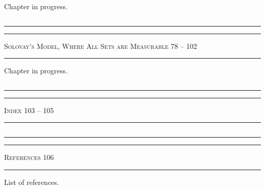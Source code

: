 \noindent Chapter in progress.

${}$\\[-0.1cm] \hrule\hrule
${}$\\[0.2cm]
{\scshape Solovay's Model, Where All Sets are Measurable \hfill 78 -- 102 } \\[-0.3cm]
\hrule
${}$\\[-0.1cm]

\noindent Chapter in progress.

${}$\\[-0.1cm] \hrule\hrule
${}$\\[0.2cm]
{\scshape Index \hfill 103 -- 105 } \\[-0.3cm]
\hrule
${}$\\[-0.1cm]


${}$\\[-0.1cm] \hrule\hrule
${}$\\[0.2cm]
{\scshape References \hfill 106 } \\[-0.3cm]
\hrule
${}$\\[-0.1cm]

\noindent List of references.



